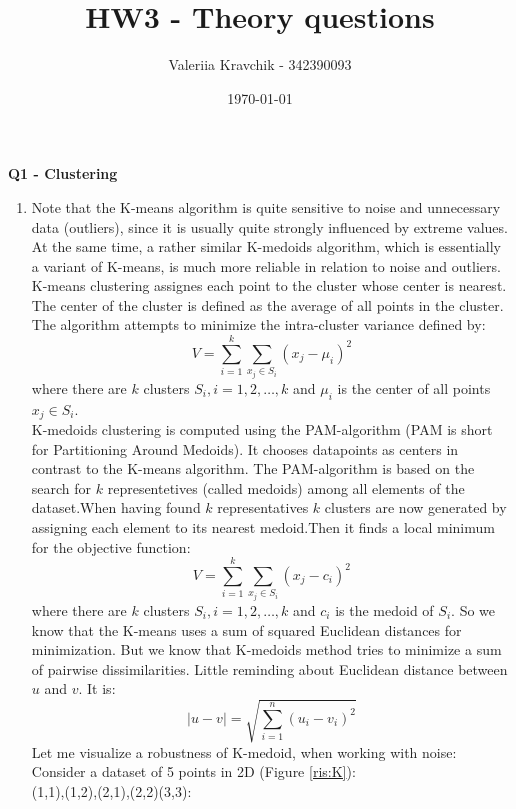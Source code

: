 \documentclass[12pt,a4paper]{article}
\begin{document}
\title{HW3 - Theory questions}
\author{Valeriia Kravchik - 342390093}
\date{\today}
\maketitle
\newpage
\begin{center}
\textbf{Q1 - Clustering}
\end{center}
\begin{enumerate}[label=(\alph*)]
\item Note that the K-means algorithm is quite sensitive to noise and unnecessary data (outliers), since it is usually quite strongly influenced by extreme values. At the same time, a rather similar K-medoids algorithm, which is essentially a variant of K-means, is much more reliable in relation to noise and outliers.\cite{Mannor2011}\\
K-means clustering assignes each point to the cluster whose center is nearest. The center of the cluster is defined as the average of all points in the cluster. The algorithm attempts to minimize the intra-cluster variance defined by\cite{Lloyd}:
$$
\displaystyle V = \sum_{i=1}^{k}\sum_{x_j \in S_i}\left(x_j - \mu_i\right)^2
$$
where there are $k$ clusters $S_i, i = 1,2,\dots,k$ and $\mu_i$ is the center of all points $x_j \in S_i$.\\
K-medoids clustering is computed using the PAM-algorithm (PAM is short for Partitioning Around Medoids). It chooses datapoints as centers in contrast to the K-means algorithm. The PAM-algorithm is based on the search for $k$ representetives (called medoids) among all elements of the dataset.When having found $ k$ representatives $ k$ clusters are now generated by assigning each element to its nearest medoid.Then it finds a local minimum for the objective function\cite{Kaufman}:
$$
\displaystyle V = \sum_{i=1}^{k}\sum_{x_j \in S_i}\left(x_j - c_i\right)^2
$$
where there are $k$ clusters $S_i, i = 1,2,\dots,k$ and $c_i$ is the medoid of $ S_i$.
So we know that the K-means uses a sum of squared Euclidean distances for minimization. But we know that K-medoids method tries to minimize a sum of pairwise dissimilarities. Little reminding about Euclidean distance between $ u$ and $ v$. It is:
$$
\displaystyle \vert u-v\vert = \sqrt{\sum_{i=1}^n (u_i-v_i)^2} 
$$
Let me visualize a robustness of K-medoid, when working with noise:\\
Consider a dataset of 5  points in 2D (Figure \ref{ris:K}):\\ (1,1),(1,2),(2,1),(2,2)(3,3):\\

\end{enumerate}
\end{document}
